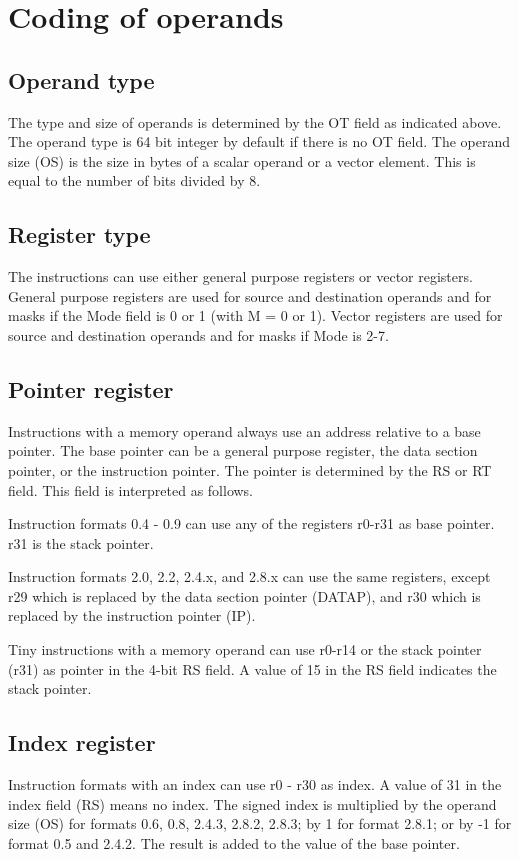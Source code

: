 \documentclass[forwardcom.tex]{subfiles}
\begin{document}
\vspace{2mm}
\section{Coding of operands}
\subsection{Operand type}
The type and size of operands is determined by the OT field as indicated above. The operand type is 64 bit integer by default if there is no OT field. The operand size (OS) is the size in bytes of a scalar operand or a vector element. This is equal to the number of bits divided by 8.

\subsection{Register type}
The instructions can use either general purpose registers or vector registers. General purpose registers are used for source and destination operands and for masks if the Mode field is 0 or 1 (with M = 0 or 1). Vector registers are used for source and destination operands and for masks if Mode is 2-7.

\subsection{Pointer register}
Instructions with a memory operand always use an address relative to a base pointer. The base pointer can be a general purpose register, the data section pointer, or the instruction pointer. The pointer is determined by the RS or RT field. This field is interpreted as follows.
\vspace{2mm}

Instruction formats 0.4 - 0.9 can use any of the registers r0-r31 as base pointer. r31 is the stack pointer.
\vspace{2mm}

Instruction formats 2.0, 2.2, 2.4.x, and 2.8.x can use the same registers, except r29 which is replaced by the data section pointer (DATAP), and r30 which is replaced by the instruction pointer (IP).
\vspace{2mm}

Tiny instructions with a memory operand can use r0-r14 or the stack pointer (r31) as pointer in the 4-bit RS field. A value of 15 in the RS field indicates the stack pointer.

\subsection{Index register}
Instruction formats with an index can use r0 - r30 as index. A value of 31 in the index field (RS) means no index. The signed index is multiplied by the operand size (OS) for formats 0.6, 0.8, 2.4.3, 2.8.2, 2.8.3; by 1 for format 2.8.1; or by -1 for format 0.5 and 2.4.2. The result is added to the value of the base pointer.
\end{document}
